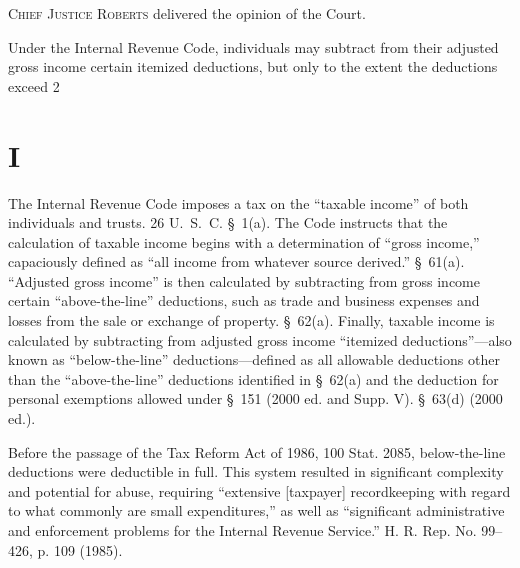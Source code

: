 
\setcounter{page}{183}

  \textsc{Chief Justice Roberts} delivered the opinion of the Court.

  Under the Internal Revenue Code, individuals may subtract from their adjusted gross income certain itemized deductions, but only to the extent the deductions exceed 2%

\section{I}

  The Internal Revenue Code imposes a tax on the ``taxable income'' of both individuals and trusts. 26 U.~S.~C. \S~1(a). The Code instructs that the calculation of taxable income begins with a determination of ``gross income,'' capaciously defined as ``all income from whatever source derived.'' \S~61(a). ``Adjusted gross income'' is then calculated by subtracting from gross income certain ``above-the-line'' deductions, such as trade and business expenses and losses from the sale or exchange of property. \S~62(a). Finally, taxable income is calculated by subtracting from adjusted gross income ``itemized deductions''---also known as ``below-the-line'' deductions---defined as all allowable deductions other than the ``above-the-line'' deductions identified in \S~62(a) and the deduction for personal exemptions allowed under \S~151 (2000 ed. and Supp. V). \S~63(d) (2000 ed.).

  Before the passage of the Tax Reform Act of 1986, 100 Stat. 2085, below-the-line deductions were deductible in full. This system resulted in significant complexity and potential for abuse, requiring ``extensive [taxpayer] recordkeeping with regard to what commonly are small expenditures,'' as well as ``significant administrative and enforcement problems for the Internal Revenue Service.'' H. R. Rep. No. 99--426, p. 109 (1985).

